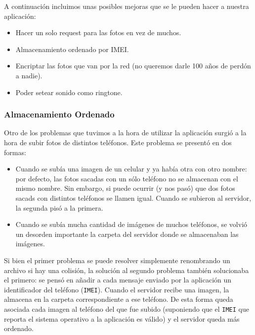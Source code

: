 A continuación incluimos unas posibles mejoras que se le pueden hacer a nuestra aplicación:

\label{ssub:Mejoras}
\begin{itemize}
	\item Hacer un solo request para las fotos en vez de muchos.
	\item Almacenamiento ordenado por IMEI.
	\item Encriptar las fotos que van por la red (no queremos darle 100 años de perdón a nadie).
	\item Poder setear sonido como ringtone.
\end{itemize}

\subsubsection{Almacenamiento Ordenado} %
\label{ssub:almacenamiento_ordenado}

Otro de los problemas que tuvimos a la hora de utilizar la aplicación surgió a la hora de subir fotos de distintos teléfonos. Este problema se presentó en dos formas:
\begin{itemize}
	\item Cuando se subía una imagen de un celular y ya había otra con otro nombre: por defecto, las fotos sacadas con un sólo teléfono no se almacenan con el mismo nombre. Sin embargo, si puede ocurrir (y nos pasó) que dos fotos sacads con distintos teléfonos se llamen igual. Cuando se subieron al servidor, la segunda pisó a la primera.
	\item Cuando se subía mucha cantidad de imágenes de muchos teléfonos, se volvió un desorden importante la carpeta del servidor donde se almacenaban las imágenes.
\end{itemize}


Si bien el primer problema se puede resolver simplemente renombrando un archivo si hay una colisión, la solución al segundo problema también solucionaba el primero: se pensó en añadir a cada mensaje enviado por la aplicación un identificador del teléfono (\texttt{IMEI}). Cuando el servidor recibe una imagen, la almacena en la carpeta correspondiente a ese teléfono. De esta forma queda asociada cada imagen al teléfono del que fue subido (suponiendo que el \texttt{IMEI} que reporta el sistema operativo a la aplicación es válido) y el servidor queda más ordenado.



